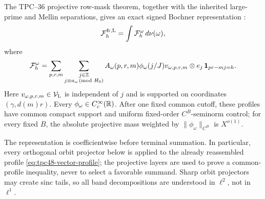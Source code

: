 The TPC--36 projective row-mask theorem, together with the inherited
large-prime and Mellin separations, gives an exact signed Bochner
representation \citep{WangTPC25,WangTPC36,WangTPC47}:
\begin{equation}
 \mathcal F_h^{\rm fr,\mathrm L}=\int\mathcal F_h^\omega\,d\nu(\omega),
 \label{eq:tpc48-signed-reassembly}
\end{equation}
where
\begin{equation}
 \mathcal F_h^\omega
 =\sum_{p,r,m}
 \sum_{\substack{j\in\mathbb Z\\j\equiv a_\omega\!\!\pmod{H_0}}}
 A_\omega(p,r,m)\phi_\omega(j/J)
 v_{\omega,p,r,m}\otimes e_j\,
 \mathbf 1_{pr-mj=h}.
 \label{eq:tpc48-projective-layer}
\end{equation}
Here \(v_{\omega,p,r,m}\in\mathcal V_{\mathrm L}\) is independent of \(j\) and is
supported on coordinates \((\gamma,d(m)r)\).  Every
\(\phi_\omega\in C_c^\infty(\mathbb R)\).  After one fixed common cutoff,
these profiles have common compact support and uniform
fixed-order \(C^B\)-seminorm control; for every fixed \(B\), the
absolute projective mass weighted by
\(\|\phi_\omega\|_{C^B}\) is \(X^{o(1)}\).

The representation is coefficientwise before terminal summation.  In
particular, every orthogonal orbit projector below is applied to the
already reassembled profile \eqref{eq:tpc48-vector-profile}; the
projective layers are used to prove a common-profile inequality, never
to select a favorable summand.  Sharp orbit projectors may create sinc
tails, so all band decompositions are understood in \(\ell^2\), not in
\(\ell^1\).
